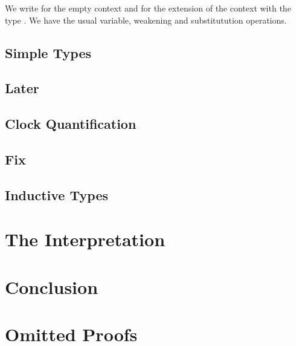 \documentclass[a4paper,UKenglish,cleveref, autoref,numberwithinsect]{lipics-v2018}
\newcommand{\D}{\AgdaDatatype}
\newcommand{\Ar}{\AgdaArgument}
\begin{document}


We write \D{∙} for the empty context and \Ar{Γ} \D{,,} \Ar{A} for the
extension of the context \Ar{Γ} with the type \Ar{A}. We have
the usual variable, weakening and substitutution operations.



\subsection{Simple Types}



\subsection{Later}

\subsection{Clock Quantification}

\subsection{Fix}

\subsection{Inductive Types}

\section{The Interpretation}

\section{Conclusion}

\appendix
\section{Omitted Proofs}





\end{document}

